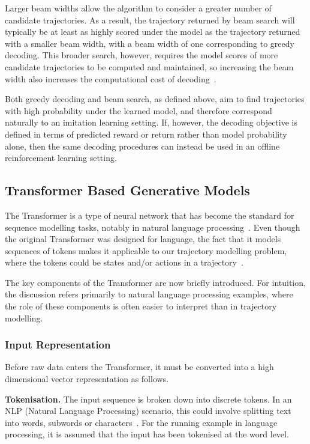 ﻿\documentclass[12pt,a4paper]{article}
\let\oldcite\cite
\renewcommand{\cite}[1]{\mbox{\oldcite{#1}}}
\theoremstyle{definition}
\begin{document}
Larger beam widths allow the algorithm to consider a greater number of candidate trajectories. As a result, 
the trajectory returned by beam search will typically be at least as highly scored under the model as the trajectory 
returned with a smaller beam width, with a beam width of one corresponding to greedy decoding. This broader search, however,
requires the model scores of more candidate trajectories to be computed and maintained, so increasing the beam width also 
increases the computational cost of decoding~\cite{jurafsky2026speech}.

Both greedy decoding and beam search, as defined above, aim to find trajectories with high probability
under the learned model, and therefore correspond naturally to an imitation learning setting. 
If, however, the decoding objective is defined in terms of predicted reward or return rather 
than model probability alone, then the same decoding procedures can instead be used in an 
offline reinforcement learning setting.


\subsection{Transformer Based Generative Models}

The Transformer is a type of neural network that has become the standard for sequence modelling tasks, notably in natural language processing~\cite{jurafsky2026speech}.
Even though the original Transformer was designed for language, the fact that it models sequences of tokens makes it applicable to our trajectory modelling problem, where the tokens could be states and/or actions in a trajectory~\cite{janner2021trajectory}.

The key components of the Transformer are now briefly introduced. For intuition, the discussion refers 
primarily to natural language processing examples, where the role of these components is often easier to 
interpret than in trajectory modelling. 

\subsubsection{Input Representation}

Before raw data enters the Transformer, it must be converted into a high dimensional vector representation
as follows.

\textbf{\small Tokenisation.} The input sequence is broken down into discrete tokens. In an NLP (Natural Language Processing) scenario, 
this could involve splitting text into words, subwords or characters~\cite{jurafsky2026speech}. For the running example in language processing, it is assumed that 
the input has been tokenised at the word level.
\end{document}
